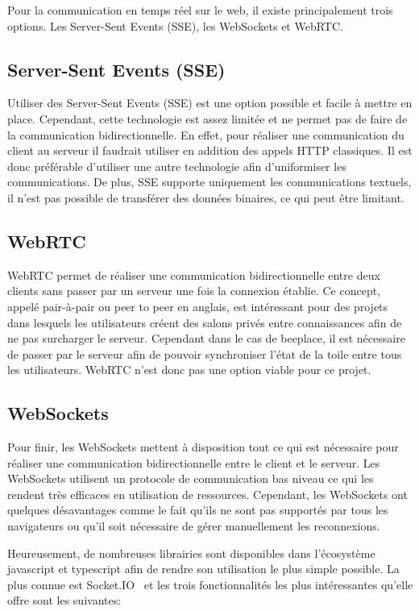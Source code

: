 Pour la communication en temps réel sur le web, il existe principalement trois options. Les Server-Sent Events (SSE), les WebSockets et WebRTC.

\subsection{Server-Sent Events (SSE)}
Utiliser des Server-Sent Events (SSE) est une option possible et facile à mettre en place. Cependant, cette technologie est assez limitée et ne permet pas de faire de la communication bidirectionnelle. En effet, pour réaliser une communication du client au serveur il faudrait utiliser en addition des appels HTTP classiques. Il est donc préférable d'utiliser une autre technologie afin d'uniformiser les communications. De plus, SSE supporte uniquement les communications textuels, il n'est pas possible de transférer des données binaires, ce qui peut être limitant.

\subsection{WebRTC}
WebRTC permet de réaliser une communication bidirectionnelle entre deux clients sans passer par un serveur une fois la connexion établie. Ce concept, appelé pair-à-pair ou peer to peer en anglais, est intéressant pour des projets dans lesquels les utilisateurs créent des salons privés entre connaissances afin de ne pas surcharger le serveur. Cependant dans le cas de \gls{beeplace}, il est nécessaire de passer par le serveur afin de pouvoir synchroniser l'état de la toile entre tous les utilisateurs. WebRTC n'est donc pas une option viable pour ce projet.

\subsection{WebSockets}
Pour finir, les WebSockets mettent à disposition tout ce qui est nécessaire pour réaliser une communication bidirectionnelle entre le client et le serveur. Les WebSockets utilisent un protocole de communication bas niveau ce qui les rendent très efficaces en utilisation de ressources. Cependant, les WebSockets ont quelques désavantages comme le fait qu'ils ne sont pas supportés par tous les navigateurs ou qu'il soit nécessaire de gérer manuellement les reconnexions.

Heureusement, de nombreuses librairies sont disponibles dans l'écosystème \gls{javascript} et \gls{typescript} afin de rendre son utilisation le plus simple possible. La plus connue est Socket.IO~\cite{socket-io} et les trois fonctionnalités les plus intéressantes qu'elle offre sont les suivantes:

